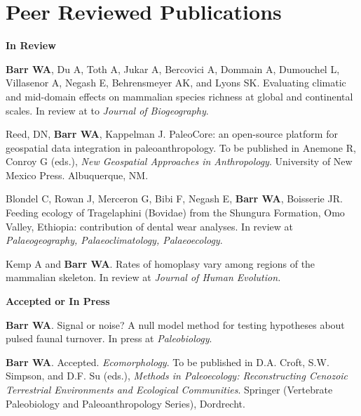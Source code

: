 \documentclass{article}
\begin{document}
\section*{Peer Reviewed Publications}

\begin{description*}
\item[] {\bfseries In Review}
\item[]{\bfseries Barr WA}, Du A, Toth A, Jukar A,  Bercovici A,  Dommain A,  Dumouchel L,  Villasenor A,  Negash E, Behrensmeyer AK, and Lyons SK. Evaluating climatic and mid-domain effects on mammalian species richness at global and continental scales. In review at to \emph{Journal of Biogeography}.
\item[] Reed, DN, {\bfseries Barr WA}, Kappelman J. PaleoCore: an open-source platform for geospatial data integration in paleoanthropology. To be published in Anemone R, Conroy G (eds.), \emph{New Geospatial Approaches in Anthropology}. University of New Mexico Press. Albuquerque, NM.
\item[] Blondel C, Rowan J, Merceron G, Bibi F,  Negash E, {\bfseries Barr WA}, Boisserie JR. Feeding ecology of Tragelaphini (Bovidae) from the Shungura Formation, Omo Valley, Ethiopia: contribution of dental wear analyses. In review at \emph{Palaeogeography, Palaeoclimatology, Palaeoecology}.

\item[] Kemp A and {\bfseries Barr WA}. Rates of homoplasy vary among regions of the mammalian skeleton. In review at \emph{Journal of Human Evolution.} 
\end{description*}

\begin{description*}
\item[] {\bfseries Accepted or In Press}
\item[] {\bfseries Barr WA}. Signal or noise? A null model method for testing hypotheses about pulsed faunal turnover. In press at \emph{Paleobiology}.
\item[] {\bfseries Barr WA}. Accepted.  \emph{Ecomorphology}. To be published in D.A. Croft, S.W. Simpson, and D.F. Su (eds.),  \emph{Methods in Paleoecology: Reconstructing Cenozoic Terrestrial Environments and Ecological Communities}. Springer (Vertebrate Paleobiology and Paleoanthropology Series), Dordrecht.
\end{description*}
\end{document}
